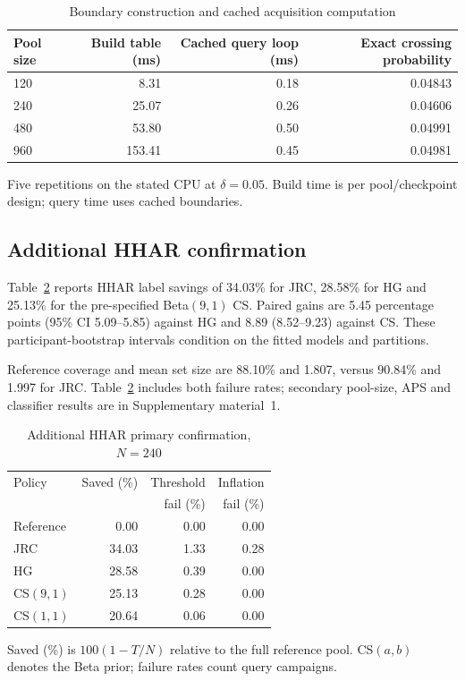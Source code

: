 \documentclass[preprint,12pt]{elsarticle}
\newcommand{\botrule}{\bottomrule}
\begin{document}
\begin{table}[!htbp]\centering\small
\caption{Boundary construction and cached acquisition computation}\label{tab:runtime}
\begin{tabular}{lrrr}
\toprule
Pool size & Build table (ms) & Cached query loop (ms) & Exact crossing probability \\
\midrule
120 & 8.31 & 0.18 & 0.04843 \\
240 & 25.07 & 0.26 & 0.04606 \\
480 & 53.80 & 0.50 & 0.04991 \\
960 & 153.41 & 0.45 & 0.04981 \\
\botrule
\end{tabular}
\par\smallskip\begin{minipage}{\linewidth}\footnotesize Five repetitions on the stated CPU at $\delta=0.05$. Build time is per pool/checkpoint design; query time uses cached boundaries.\end{minipage}
\end{table}

\subsection{Additional HHAR confirmation}
Table~\ref{tab:hhar} reports HHAR label savings of 34.03\% for JRC, 28.58\% for HG and 25.13\% for the pre-specified Beta$(9,1)$ CS. Paired gains are 5.45 percentage points (95\% CI 5.09--5.85) against HG and 8.89 (8.52--9.23) against CS. These participant-bootstrap intervals condition on the fitted models and partitions.

Reference coverage and mean set size are 88.10\% and 1.807, versus 90.84\% and 1.997 for JRC. Table~\ref{tab:hhar} includes both failure rates; secondary pool-size, APS and classifier results are in Supplementary material~1.

\begin{table}[!htbp]\centering\small
\caption{Additional HHAR primary confirmation, $N=240$}\label{tab:hhar}
\begin{tabular}{lrrr}
\toprule
Policy & Saved (\%) & Threshold & Inflation \\
 & & fail (\%) & fail (\%) \\
\midrule
Reference & 0.00 & 0.00 & 0.00 \\
JRC & 34.03 & 1.33 & 0.28 \\
HG & 28.58 & 0.39 & 0.00 \\
CS$(9,1)$ & 25.13 & 0.28 & 0.00 \\
CS$(1,1)$ & 20.64 & 0.06 & 0.00 \\
\botrule
\end{tabular}
\par\smallskip\begin{minipage}{\linewidth}\footnotesize Saved (\%) is $100(1-T/N)$ relative to the full reference pool. CS$(a,b)$ denotes the Beta prior; failure rates count query campaigns.\end{minipage}
\end{table}
\FloatBarrier
\end{document}
